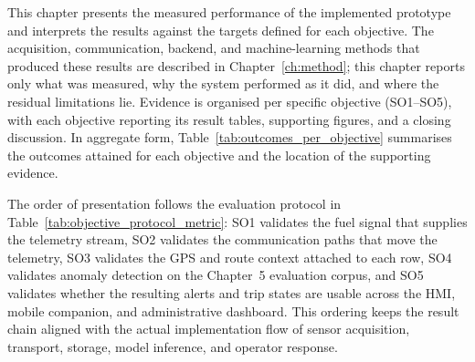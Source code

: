 This chapter presents the measured performance of the implemented prototype and interprets the results against the targets defined for each objective. The acquisition, communication, backend, and machine-learning methods that produced these results are described in Chapter~\ref{ch:method}; this chapter reports only what was measured, why the system performed as it did, and where the residual limitations lie. Evidence is organised per specific objective (SO1--SO5), with each objective reporting its result tables, supporting figures, and a closing discussion. In aggregate form, Table~\ref{tab:outcomes_per_objective} summarises the outcomes attained for each objective and the location of the supporting evidence.

The order of presentation follows the evaluation protocol in Table~\ref{tab:objective_protocol_metric}: SO1 validates the fuel signal that supplies the telemetry stream, SO2 validates the communication paths that move the telemetry, SO3 validates the GPS and route context attached to each row, SO4 validates anomaly detection on the Chapter~5 evaluation corpus, and SO5 validates whether the resulting alerts and trip states are usable across the HMI, mobile companion, and administrative dashboard. This ordering keeps the result chain aligned with the actual implementation flow of sensor acquisition, transport, storage, model inference, and operator response.


